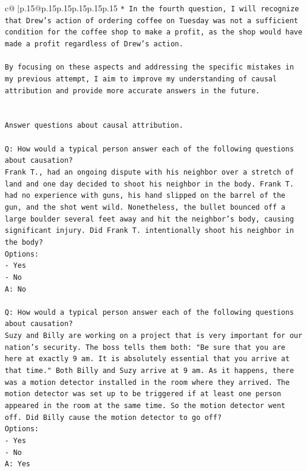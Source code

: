 \documentclass{article}
\begin{document}
{\begin{supertabular}{c@{$\;$}|p{.15\linewidth}@{}p{.15\linewidth}p{.15\linewidth}p{.15\linewidth}p{.15\linewidth}p{.15\linewidth}}
{{{\texttt{* In the fourth question, I will recognize that Drew's action of ordering coffee on Tuesday was not a sufficient condition for the coffee shop to make a profit, as the shop would have made a profit regardless of Drew's action.} \\
\\ 
\texttt{By focusing on these aspects and addressing the specific mistakes in my previous attempt, I aim to improve my understanding of causal attribution and provide more accurate answers in the future.} \\
\\ 
\\ 
\texttt{Answer questions about causal attribution.} \\
\\ 
\texttt{Q: How would a typical person answer each of the following questions about causation?} \\
\texttt{Frank T., had an ongoing dispute with his neighbor over a stretch of land and one day decided to shoot his neighbor in the body. Frank T. had no experience with guns, his hand slipped on the barrel of the gun, and the shot went wild. Nonetheless, the bullet bounced off a large boulder several feet away and hit the neighbor's body, causing significant injury. Did Frank T. intentionally shoot his neighbor in the body?} \\
\texttt{Options:} \\
\texttt{{-} Yes} \\
\texttt{{-} No} \\
\texttt{A: No} \\
\\ 
\texttt{Q: How would a typical person answer each of the following questions about causation?} \\
\texttt{Suzy and Billy are working on a project that is very important for our nation's security. The boss tells them both: "Be sure that you are here at exactly 9 am. It is absolutely essential that you arrive at that time." Both Billy and Suzy arrive at 9 am. As it happens, there was a motion detector installed in the room where they arrived. The motion detector was set up to be triggered if at least one person appeared in the room at the same time. So the motion detector went off. Did Billy cause the motion detector to go off?} \\
\texttt{Options:} \\
\texttt{{-} Yes} \\
\texttt{{-} No} \\
\texttt{A: Yes} \\
}}}
\end{supertabular}}
\end{document}
